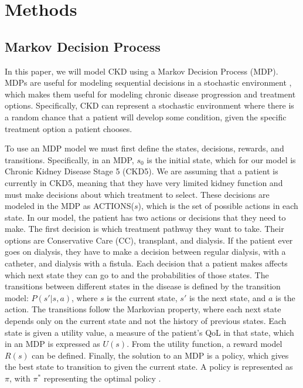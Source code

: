 \documentclass[10pt,twocolumn]{article}
\begin{document}

\section{Methods}
\subsection{Markov Decision Process}
In this paper, we will model CKD using a Markov Decision Process (MDP). MDPs are useful for modeling sequential decisions in a stochastic environment \cite{ai}, which makes them useful for modeling chronic disease progression and treatment options. Specifically, CKD can represent a stochastic environment where there is a random chance that a patient will develop some condition, given the specific treatment option a patient chooses.

To use an MDP model we must first define the states, decisions, rewards, and transitions. Specifically, in an MDP, \(s_0\) is the initial state, which for our model is Chronic Kidney Disease Stage 5 (CKD5). We are assuming that a patient is currently in CKD5, meaning that they have very limited kidney function and must make decisions about which treatment to select. These decisions are modeled in the MDP as ACTIONS(\(s\)), which is the set of possible actions in each state. In our model, the patient has two actions or decisions that they need to make. The first decision is which treatment pathway they want to take. Their options are Conservative Care (CC), transplant, and dialysis. If the patient ever goes on dialysis, they have to make a decision between regular dialysis, with a catheter, and dialysis with a fistula. Each decision that a patient makes affects which next state they can go to and the probabilities of those states. The transitions between different states in the disease is defined by the transition model: \(P(s' | s, a)\), where \(s\) is the current state, \(s'\) is the next state, and \(a\) is the action. The transitions follow the Markovian property, where each next state depends only on the current state and not the history of previous states. Each state is given a utility value, a measure of the patient's QoL in that state, which in an MDP is expressed as \(U(s)\). From the utility function, a reward model \(R(s)\) can be defined. Finally, the solution to an MDP is a policy, which gives the best state to transition to given the current state. A policy is represented as \(\pi\), with \(\pi^*\) representing the optimal policy \cite{ai}.
\end{document}

